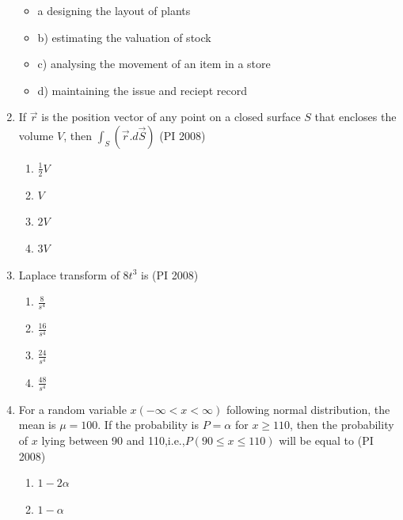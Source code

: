 \documentclass[journal,12pt,onecolumn]{IEEEtran}
\theoremstyle{remark}
\begin{document}
\begin{enumerate}
\begin{itemize}
        \item a designing the layout of plants
        \item b) estimating the valuation of stock
        \item c) analysing the movement of an item in a store
        \item d) maintaining the issue and reciept record
    \end{itemize}
    \vspace{1cm}
    \item %
    If $\Vec{r}$ is the position vector of any point on a closed surface $S$ that encloses the volume $V$, then    
    $\int_{S}\left(\vec{r}.d\vec{S}\right)$ 
    \hfill{(PI 2008)}
    \begin{multicols}{4}
    \begin{enumerate}
        \item $\frac{1}{2}V$
        \item $V$
        \item $2V$
        \item $3V$
    \end{enumerate}
\end{multicols}
\vspace{1cm}
\item %
Laplace transform of $8t^3$ is     \hfill{(PI 2008)}
    \begin{multicols}{4}
    \begin{enumerate}
        \item $\frac{8}{s^4}$
        \item $\frac{16}{s^4}$
        \item $\frac{24}{s^4}$
        \item $\frac{48}{s^4}$
    \end{enumerate}
\end{multicols}
\vspace{1cm}
\item  %
For a random variable $x (-\infty<x<\infty)$ following normal distribution, the mean is $\mu=100$. If the probability is $P=\alpha$ for $x\geq110$, then the probability of $x$ lying between 90 and 110,i.e.,$P(90\leq x \leq 110 )$ will be equal to
    \hfill{(PI 2008)}
    \begin{multicols}{4}
    \begin{enumerate}
        \item $1-2\alpha$
        \item $1-\alpha$

\end{enumerate}
\end{multicols}
\end{enumerate}
\end{document}
